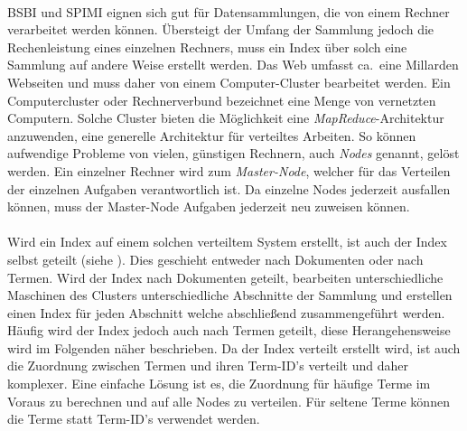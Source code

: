 \paragraph{}
BSBI und SPIMI eignen sich gut für Datensammlungen, die von einem Rechner verarbeitet werden können. Übersteigt der Umfang der Sammlung jedoch die Rechenleistung eines einzelnen Rechners, muss ein Index über solch eine Sammlung auf andere Weise erstellt werden. Das Web umfasst ca.\ eine Millarden Webseiten und muss daher von einem Computer-Cluster bearbeitet werden. Ein Computercluster oder Rechnerverbund bezeichnet eine Menge von vernetzten Computern. Solche Cluster bieten die Möglichkeit eine \textit{MapReduce}-Architektur anzuwenden, eine generelle Architektur für verteiltes Arbeiten. So können aufwendige Probleme von vielen, günstigen Rechnern, auch \textit{Nodes} genannt, gelöst werden. Ein einzelner Rechner wird zum \textit{Master-Node}, welcher für das Verteilen der einzelnen Aufgaben verantwortlich ist. Da einzelne Nodes jederzeit ausfallen können, muss der Master-Node Aufgaben jederzeit neu zuweisen können.\par

\paragraph{}
Wird ein Index auf einem solchen verteiltem System erstellt, ist auch der Index selbst geteilt (siehe ). Dies geschieht entweder nach Dokumenten oder nach Termen. Wird der Index nach Dokumenten geteilt, bearbeiten unterschiedliche Maschinen des Clusters unterschiedliche Abschnitte der Sammlung und erstellen einen Index für jeden Abschnitt welche abschließend zusammengeführt werden. Häufig wird der Index jedoch auch nach Termen geteilt, diese Herangehensweise wird im Folgenden näher beschrieben. Da der Index verteilt erstellt wird, ist auch die Zuordnung zwischen Termen und ihren Term-ID's verteilt und daher komplexer. Eine einfache Lösung ist es, die Zuordnung für häufige Terme im Voraus zu berechnen und auf alle Nodes zu verteilen. Für seltene Terme können die Terme statt Term-ID's verwendet werden.\par

